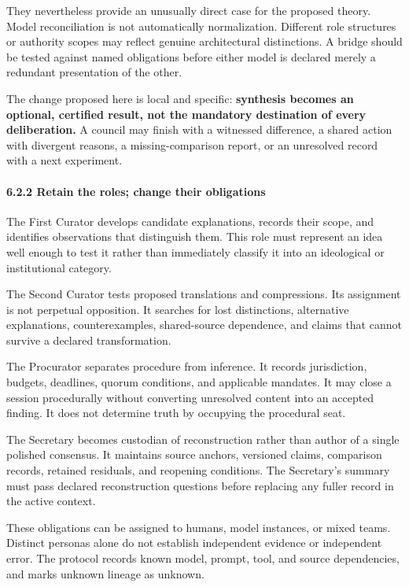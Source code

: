 \documentclass[
  10pt,
]{article}
\begin{document}
They nevertheless provide an unusually direct case for the proposed theory. Model reconciliation is not automatically normalization. Different role structures or authority scopes may reflect genuine architectural distinctions. A bridge should be tested against named obligations before either model is declared merely a redundant presentation of the other.

The change proposed here is local and specific: \textbf{synthesis becomes an optional, certified result, not the mandatory destination of every deliberation.} A council may finish with a witnessed difference, a shared action with divergent reasons, a missing-comparison report, or an unresolved record with a next experiment.

\paragraph{6.2.2 Retain the roles; change their obligations}\label{retain-the-roles-change-their-obligations}

The First Curator develops candidate explanations, records their scope, and identifies observations that distinguish them. This role must represent an idea well enough to test it rather than immediately classify it into an ideological or institutional category.

The Second Curator tests proposed translations and compressions. Its assignment is not perpetual opposition. It searches for lost distinctions, alternative explanations, counterexamples, shared-source dependence, and claims that cannot survive a declared transformation.

The Procurator separates procedure from inference. It records jurisdiction, budgets, deadlines, quorum conditions, and applicable mandates. It may close a session procedurally without converting unresolved content into an accepted finding. It does not determine truth by occupying the procedural seat.

The Secretary becomes custodian of reconstruction rather than author of a single polished consensus. It maintains source anchors, versioned claims, comparison records, retained residuals, and reopening conditions. The Secretary's summary must pass declared reconstruction questions before replacing any fuller record in the active context.

These obligations can be assigned to humans, model instances, or mixed teams. Distinct personas alone do not establish independent evidence or independent error. The protocol records known model, prompt, tool, and source dependencies, and marks unknown lineage as unknown.
\end{document}
